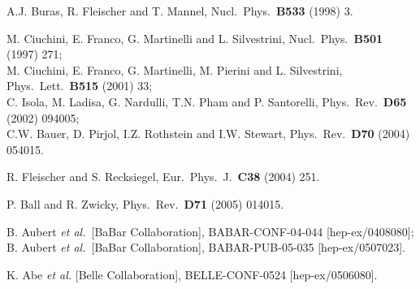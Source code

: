 \documentclass[12pt]{article}
\begin{document}
\begin{thebibliography}{999}
A.J. Buras, R. Fleischer and T. Mannel,
{ Nucl.\ Phys.}~{\bf B533} (1998) 3.

M. Ciuchini, E. Franco, G. Martinelli and L. Silvestrini,
  { Nucl.\ Phys.}~{\bf B501} (1997) 271;\\
M. Ciuchini, E. Franco, G. Martinelli, M. Pierini 
and L. Silvestrini,
{ Phys.\ Lett.}~{\bf B515} (2001) 33;\\
C. Isola, M. Ladisa, G. Nardulli, T.N. Pham and P. Santorelli,
{ Phys.\ Rev.}~{\bf D65} (2002) 094005;\\
C.W. Bauer, D. Pirjol, I.Z. Rothstein and I.W. Stewart,
 { Phys.\ Rev.}~{\bf D70} (2004) 054015.

R. Fleischer and S. Recksiegel,
  { Eur.\ Phys.\ J.}~{\bf C38} (2004) 251.

P. Ball and R. Zwicky,
  { Phys.\ Rev}.~{\bf D71} (2005) 014015.

B. Aubert {\it et al.}\  [BaBar Collaboration],
 BABAR-CONF-04-044 [hep-ex/0408080];\\
   B. Aubert {\it et al.}\  [BaBar Collaboration],
  BABAR-PUB-05-035 [hep-ex/0507023].

K. Abe {\it et al.}  [Belle Collaboration],
  BELLE-CONF-0524 [hep-ex/0506080].


\end{thebibliography}
\end{document}
